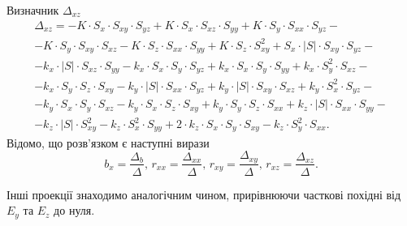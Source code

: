 Визначник $ \Delta_{xz}$
\begin{gather*}
  \Delta_{xz} =
  -K \cdot S_x \cdot S_{xy} \cdot S_{yz} + K \cdot S_x \cdot S_{xz} \cdot S_{yy} +
  K \cdot S_y \cdot S_{xx} \cdot S_{yz} - \\
  - K \cdot S_y \cdot S_{xy} \cdot S_{xz} - K \cdot S_z \cdot S_{xx} \cdot S_{yy} +
  K \cdot S_z \cdot S_{xy}^2 + S_x \cdot \left| S \right| \cdot S_{xy} \cdot S_{yz} - \\
  - k_x \cdot \left| S \right| \cdot S_{xz} \cdot S_{yy} - k_x \cdot S_x \cdot S_y \cdot S_{yz} +
  k_x \cdot S_x \cdot S_y \cdot S_{yy} + k_x \cdot S_y^2 \cdot S_{xz} - \\
  - k_x \cdot S_y \cdot S_z \cdot S_{xy} - k_y \cdot \left| S \right| \cdot S_{xx} \cdot S_{yz} +
  k_y \cdot \left| S \right| \cdot S_{xy} \cdot S_{xz} + k_y \cdot S_x^2 \cdot S_{yz} - \\
  - k_y \cdot S_x \cdot S_y \cdot S_{xz} - k_y \cdot S_x \cdot S_z \cdot S_{xy} +
  k_y \cdot S_y \cdot S_z \cdot S_{xx} +
  k_z \cdot \left| S \right| \cdot S_{xx} \cdot S_{yy} - \\
  - k_z \cdot \left| S \right| \cdot S_{xy}^2 - k_z \cdot S_x^2 \cdot S_{yy} +
  2 \cdot k_z \cdot S_x \cdot S_y \cdot S_{xy} - k_z \cdot S_y^2 \cdot S_{xx}.
\end{gather*}
Відомо, що розв'язком є наступні вирази \cite{voyevodin}
\begin{equation*}
  b_x = \frac{ \Delta_b}{ \Delta }, \,
  r_{xx} = \frac{ \Delta_{xx}}{ \Delta }, \,
  r_{xy} = \frac{ \Delta_{xy}}{ \Delta }, \,
  r_{xz} = \frac{ \Delta_{xz}}{ \Delta }.
\end{equation*}

Інші проекції знаходимо аналогічним чином, прирівнюючи часткові похідні від
$E_y$ та $E_z$ до нуля.


